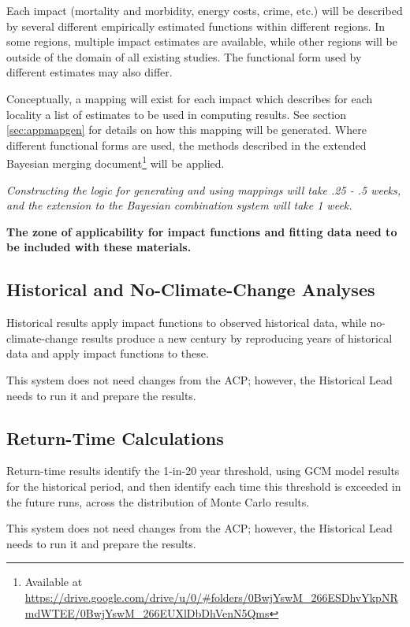 \documentclass[12pt, oneside]{amsart}
\begin{document}
Each impact (mortality and morbidity, energy costs, crime, etc.) will be described by several different empirically estimated functions within different regions.  In some regions, multiple impact estimates are available, while other regions will be outside of the domain of all existing studies.  The functional form used by different estimates may also differ.

Conceptually, a mapping will exist for each impact which describes for each locality a list of estimates to be used in computing results.  See section \ref{sec:appmapgen} for details on how this mapping will be generated.  Where different functional forms are used, the methods described in the extended Bayesian merging document\footnote{Available at \url{https://drive.google.com/drive/u/0/#folders/0BwjYswM_266ESDhvYkpNRmdWTEE/0BwjYswM_266EUXlDbDhVenN5Qms}} will be applied.

{\it Constructing the logic for generating and using mappings will take .25 - .5 weeks, and the extension to the Bayesian combination system will take 1 week.}

{\bf The zone of applicability for impact functions and fitting data need to be included with these materials.}

\subsection{Historical and No-Climate-Change Analyses}
\label{sec:historical}

Historical results apply impact functions to observed historical data,
while no-climate-change results produce a new century by reproducing
years of historical data and apply impact functions to these.

This system does not need changes from the ACP; however, the
Historical Lead needs to run it and prepare the results.

\subsection{Return-Time Calculations}
\label{sec:returntime}

Return-time results identify the 1-in-20 year threshold, using GCM
model results for the historical period, and then identify each time
this threshold is exceeded in the future runs, across the distribution
of Monte Carlo results.

This system does not need changes from the ACP; however, the
Historical Lead needs to run it and prepare the results.
\end{document}
